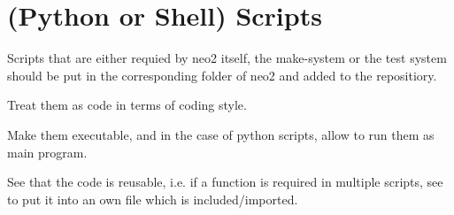 \documentclass{article}
\begin{document}
\section{(Python or Shell) Scripts}
Scripts that are either requied by neo2 itself, the make-system or the
test system should be put in the corresponding folder of neo2 and added
to the repositiory.

Treat them as code in terms of coding style.

Make them executable, and in the case of python scripts, allow to run
them as main program.

See that the code is reusable, i.e. if a function is required in
multiple scripts, see to put it into an own file which is
included/imported.
\end{document}
